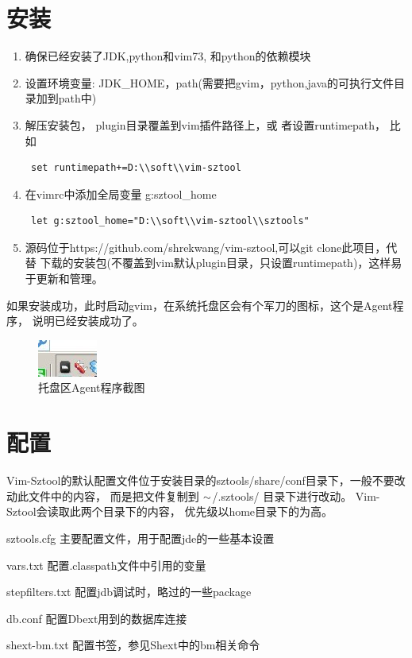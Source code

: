 \documentclass[oneside,openany]{book}
\begin{document}
  \section{安装}
    \begin{enumerate}
      \item 确保已经安装了JDK,python和vim73, 和python的依赖模块
      \item 设置环境变量: JDK\_HOME，path(需要把gvim，python,java的可执行文件目录加到path中)
      \item 解压安装包， plugin目录覆盖到vim插件路径上，或
      者设置runtimepath， 比如
      \begin{verbatim} set runtimepath+=D:\\soft\\vim-sztool \end{verbatim}
      \item 在vimrc中添加全局变量 g:sztool\_home
      \begin{verbatim} let g:sztool_home="D:\\soft\\vim-sztool\\sztools" \end{verbatim}
      \item 源码位于https://github.com/shrekwang/vim-sztool,可以git clone此项目，代替
      下载的安装包(不覆盖到vim默认plugin目录，只设置runtimepath)，这样易于更新和管理。
    \end{enumerate}
   如果安装成功，此时启动gvim，在系统托盘区会有个军刀的图标，这个是Agent程序，
   说明已经安装成功了。

   \begin{figure}[htbp]%
      \centering
      \includegraphics[scale=0.8]{tray.jpg}
      \caption{托盘区Agent程序截图}
  \end{figure}

  \section{配置}
    Vim-Sztool的默认配置文件位于安装目录的sztools/share/conf目录下，一般不要改动此文件中的内容，
  而是把文件复制到 $\tiny{\sim}$/.sztools/ 目录下进行改动。 Vim-Sztool会读取此两个目录下的内容，
  优先级以home目录下的为高。
  \begin{description}
    \item{sztools.cfg} 主要配置文件，用于配置jde的一些基本设置
    \item{vars.txt} 配置.classpath文件中引用的变量
    \item{stepfilters.txt} 配置jdb调试时，略过的一些package
    \item{db.conf} 配置Dbext用到的数据库连接
    \item{shext-bm.txt} 配置书签，参见Shext中的bm相关命令
  \end{description}
  
\end{document}
